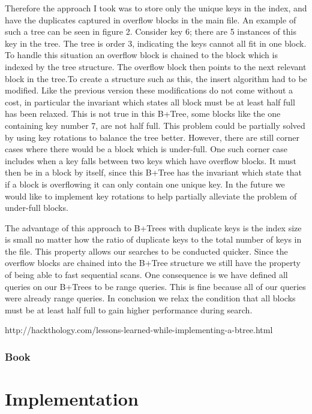 \documentclass[abstracton,12pt]{scrreprt}
\begin{document}
Therefore the approach I took was to store only the unique keys in the index, and have the duplicates captured in overflow blocks in the main file. An example of such a tree can be seen in figure 2. Consider key 6; there are 5 instances of this key in the tree. The tree is order 3, indicating the keys cannot all fit in one block. To handle this situation an overflow block is chained to the block which is indexed by the tree structure. The overflow block then points to the next relevant block in the tree.To create a structure such as this, the insert algorithm had to be modified. Like the previous version these modifications do not come without a cost, in particular the invariant which states all block must be at least half full has been relaxed. This is not true in this B+Tree, some blocks like the one containing key number 7, are not half full. This problem could be partially solved by using key rotations to balance the tree better. However, there are still corner cases where there would be a block which is under-full. One such corner case includes when a key falls between two keys which have overflow blocks. It must then be in a block by itself, since this B+Tree has the invariant which state that if a block is overflowing it can only contain one unique key. In the future we would like to implement key rotations to help partially alleviate the problem of under-full blocks.

The advantage of this approach to B+Trees with duplicate keys is the index size is small no matter how the ratio of duplicate keys to the total number of keys in the file. This property allows our searches to be conducted quicker. Since the overflow blocks are chained into the B+Tree structure we still have the property of being able to fast sequential scans. One consequence is we have defined all queries on our B+Trees to be range queries. This is fine because all of our queries were already range queries. In conclusion we relax the condition that all blocks must be at least half full to gain higher performance during search.

http://hackthology.com/lessons-learned-while-implementing-a-btree.html

\subsection{Book }

\chapter{Implementation}
\label{sec:Implementation}
\end{document}
